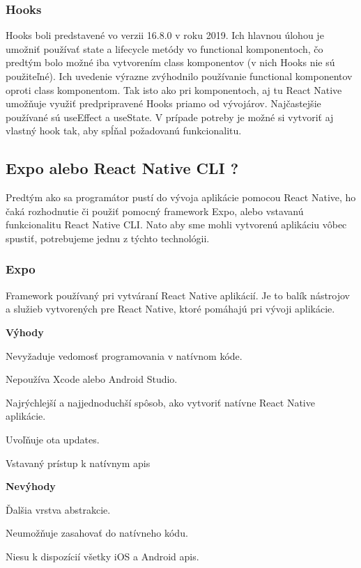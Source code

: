 \subsubsection{Hooks}
Hooks boli predstavené vo verzii 16.8.0 v roku 2019. Ich hlavnou úlohou je umožniť používať state a lifecycle metódy vo functional komponentoch, čo predtým bolo možné iba vytvorením class komponentov (v nich Hooks nie sú použiteľné). Ich uvedenie výrazne zvýhodnilo používanie functional komponentov oproti class komponentom. Tak isto ako pri komponentoch, aj tu React Native umožňuje využiť predpripravené Hooks priamo od vývojárov. Najčastejšie používané sú useEffect a useState. V prípade potreby je možné si vytvoriť aj vlastný hook tak, aby spĺňal požadovanú funkcionalitu. \cite{hooks} \\
\subsection{Expo alebo React Native CLI ?}
Predtým ako sa programátor pustí do vývoja aplikácie pomocou React Native, ho čaká rozhodnutie či použiť pomocný framework Expo, alebo vstavanú funkcionalitu React Native CLI. Nato aby sme mohli vytvorenú aplikáciu vôbec spustiť, potrebujeme jednu z týchto technológii. \\

\subsubsection{Expo}
Framework používaný pri vytváraní React Native aplikácií. Je to balík nástrojov a služieb vytvorených pre React Native, ktoré pomáhajú pri vývoji aplikácie. \cite{expo} \newline

{\bf Výhody}
\begin{itemize}
{\item Nevyžaduje vedomosť programovania v natívnom kóde.}
{\item Nepoužíva Xcode alebo Android Studio.} 
{\item Najrýchlejší a najjednoduchší spôsob, ako vytvoriť natívne React Native aplikácie.}
{\item Uvoľňuje \acrshort{ota} updates.} 
{\item Vstavaný prístup k natívnym \acrshort{api}s} \cite{expo}
\end{itemize}

{\bf Nevýhody}
\begin{itemize}
{\item Ďalšia vrstva abstrakcie.} 
{\item Neumožňuje zasahovať do natívneho kódu.}
{\item Niesu k dispozícií všetky iOS a Android \acrshort{api}s.} \cite{expo}
\end{itemize}
\bigskip

